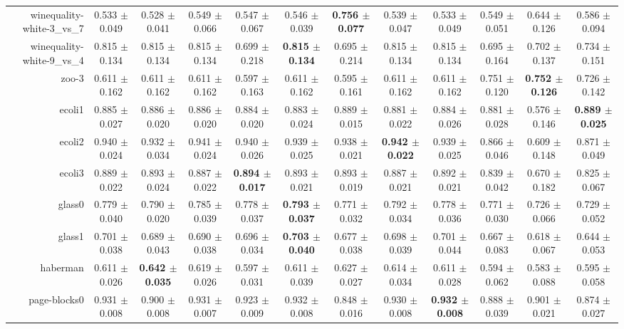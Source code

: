 \begin{table}[!ht]
{\begin{tabular}{r c c c c c c c c c c c}
winequality-white-3\_vs\_7 & 0.533 $\pm$ 0.049 & 0.528 $\pm$ 0.041 & 0.549 $\pm$ 0.066 & 0.547 $\pm$ 0.067 & 0.546 $\pm$ 0.039 & \textbf{0.756 $\pm$ 0.077} & 0.539 $\pm$ 0.047 & 0.533 $\pm$ 0.049 & 0.549 $\pm$ 0.051 & 0.644 $\pm$ 0.126 & 0.586 $\pm$ 0.094 \\
winequality-white-9\_vs\_4 & 0.815 $\pm$ 0.134 & 0.815 $\pm$ 0.134 & 0.815 $\pm$ 0.134 & 0.699 $\pm$ 0.218 & \textbf{0.815 $\pm$ 0.134} & 0.695 $\pm$ 0.214 & 0.815 $\pm$ 0.134 & 0.815 $\pm$ 0.134 & 0.695 $\pm$ 0.164 & 0.702 $\pm$ 0.137 & 0.734 $\pm$ 0.151 \\
zoo-3 & 0.611 $\pm$ 0.162 & 0.611 $\pm$ 0.162 & 0.611 $\pm$ 0.162 & 0.597 $\pm$ 0.163 & 0.611 $\pm$ 0.162 & 0.595 $\pm$ 0.161 & 0.611 $\pm$ 0.162 & 0.611 $\pm$ 0.162 & 0.751 $\pm$ 0.120 & \textbf{0.752 $\pm$ 0.126} & 0.726 $\pm$ 0.142 \\
ecoli1 & 0.885 $\pm$ 0.027 & 0.886 $\pm$ 0.020 & 0.886 $\pm$ 0.020 & 0.884 $\pm$ 0.020 & 0.883 $\pm$ 0.024 & 0.889 $\pm$ 0.015 & 0.881 $\pm$ 0.022 & 0.884 $\pm$ 0.026 & 0.881 $\pm$ 0.028 & 0.576 $\pm$ 0.146 & \textbf{0.889 $\pm$ 0.025} \\
ecoli2 & 0.940 $\pm$ 0.024 & 0.932 $\pm$ 0.034 & 0.941 $\pm$ 0.024 & 0.940 $\pm$ 0.026 & 0.939 $\pm$ 0.025 & 0.938 $\pm$ 0.021 & \textbf{0.942 $\pm$ 0.022} & 0.939 $\pm$ 0.025 & 0.866 $\pm$ 0.046 & 0.609 $\pm$ 0.148 & 0.871 $\pm$ 0.049 \\
ecoli3 & 0.889 $\pm$ 0.022 & 0.893 $\pm$ 0.024 & 0.887 $\pm$ 0.022 & \textbf{0.894 $\pm$ 0.017} & 0.893 $\pm$ 0.021 & 0.893 $\pm$ 0.019 & 0.887 $\pm$ 0.021 & 0.892 $\pm$ 0.021 & 0.839 $\pm$ 0.042 & 0.670 $\pm$ 0.182 & 0.825 $\pm$ 0.067 \\
glass0 & 0.779 $\pm$ 0.040 & 0.790 $\pm$ 0.020 & 0.785 $\pm$ 0.039 & 0.778 $\pm$ 0.037 & \textbf{0.793 $\pm$ 0.037} & 0.771 $\pm$ 0.032 & 0.792 $\pm$ 0.034 & 0.778 $\pm$ 0.036 & 0.771 $\pm$ 0.030 & 0.726 $\pm$ 0.066 & 0.729 $\pm$ 0.052 \\
glass1 & 0.701 $\pm$ 0.038 & 0.689 $\pm$ 0.043 & 0.690 $\pm$ 0.038 & 0.696 $\pm$ 0.034 & \textbf{0.703 $\pm$ 0.040} & 0.677 $\pm$ 0.038 & 0.698 $\pm$ 0.039 & 0.701 $\pm$ 0.044 & 0.667 $\pm$ 0.083 & 0.618 $\pm$ 0.067 & 0.644 $\pm$ 0.053 \\
haberman & 0.611 $\pm$ 0.026 & \textbf{0.642 $\pm$ 0.035} & 0.619 $\pm$ 0.026 & 0.597 $\pm$ 0.031 & 0.611 $\pm$ 0.039 & 0.627 $\pm$ 0.027 & 0.614 $\pm$ 0.034 & 0.611 $\pm$ 0.028 & 0.594 $\pm$ 0.062 & 0.583 $\pm$ 0.088 & 0.595 $\pm$ 0.058 \\
page-blocks0 & 0.931 $\pm$ 0.008 & 0.900 $\pm$ 0.008 & 0.931 $\pm$ 0.007 & 0.923 $\pm$ 0.009 & 0.932 $\pm$ 0.008 & 0.848 $\pm$ 0.016 & 0.930 $\pm$ 0.008 & \textbf{0.932 $\pm$ 0.008} & 0.888 $\pm$ 0.039 & 0.901 $\pm$ 0.021 & 0.874 $\pm$ 0.027 \\

\end{tabular}}
\end{table}
